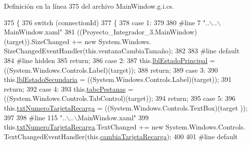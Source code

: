 Definición en la línea 375 del archivo Main\-Window.\-g.\-i.\-cs.


\begin{DoxyCode}
375                                                                                                 \{
376             \textcolor{keywordflow}{switch} (connectionId)
377             \{
378             \textcolor{keywordflow}{case} 1:
379             
380 \textcolor{preprocessor}{            #line 7 "..\(\backslash\)..\(\backslash\)MainWindow.xaml"}
381 \textcolor{preprocessor}{}            ((Proyecto\_Integrador\_3.MainWindow)(target)).SizeChanged += \textcolor{keyword}{new} System.Windows.
      SizeChangedEventHandler(\textcolor{keyword}{this}.ventanaCambiaTamaño);
382             
383 \textcolor{preprocessor}{            #line default}
384 \textcolor{preprocessor}{}\textcolor{preprocessor}{            #line hidden}
385 \textcolor{preprocessor}{}            \textcolor{keywordflow}{return};
386             \textcolor{keywordflow}{case} 2:
387             this.\hyperlink{class_proyecto___integrador__3_1_1_main_window_a3120ba863f838314aeed5764404c80d5}{lblEstadoPrincipal} = ((System.Windows.Controls.Label)(target));
388             \textcolor{keywordflow}{return};
389             \textcolor{keywordflow}{case} 3:
390             this.\hyperlink{class_proyecto___integrador__3_1_1_main_window_ab3c46fae3b8ee53389013b8cc0426f77}{lblEstadoSecundaria} = ((System.Windows.Controls.Label)(target));
391             \textcolor{keywordflow}{return};
392             \textcolor{keywordflow}{case} 4:
393             this.\hyperlink{class_proyecto___integrador__3_1_1_main_window_a46bffd3bc6bf702252e6568b9c00f35c}{tabcPestanas} = ((System.Windows.Controls.TabControl)(target));
394             \textcolor{keywordflow}{return};
395             \textcolor{keywordflow}{case} 5:
396             this.\hyperlink{class_proyecto___integrador__3_1_1_main_window_a921e64f5a9f1531f12802b32f06bf71b}{txtNumeroTarjetaRecarga} = ((System.Windows.Controls.TextBox)(target
      ));
397             
398 \textcolor{preprocessor}{            #line 115 "..\(\backslash\)..\(\backslash\)MainWindow.xaml"}
399 \textcolor{preprocessor}{}            this.\hyperlink{class_proyecto___integrador__3_1_1_main_window_a921e64f5a9f1531f12802b32f06bf71b}{txtNumeroTarjetaRecarga}.TextChanged += \textcolor{keyword}{new} System.Windows.Controls.
      TextChangedEventHandler(this.\hyperlink{class_proyecto___integrador__3_1_1_main_window_ae62fbb5bc9da0f805d207465ef0ac41a}{cambiaTarjetaRecarga});
400             
401 \textcolor{preprocessor}{            #line default}

\end{DoxyCode}
